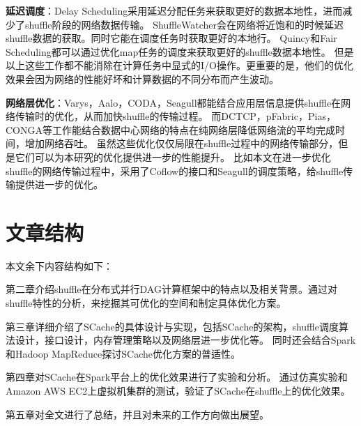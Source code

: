 \textbf{延迟调度}：Delay Scheduling\cite{delay}采用延迟分配任务来获取更好的数据本地性，进而减少了shuffle阶段的网络数据传输。
ShuffleWatcher\cite{shufflewatcher}会在网络将近饱和的时候延迟shuffle数据的获取。同时它能在调度任务时获取更好的本地行。
Quincy\cite{quincy}和Fair Scheduling\cite{preemptive}都可以通过优化map任务的调度来获取更好的shuffle数据本地性。
但是以上这些工作都不能消除在计算任务中显式的I/O操作。更重要的是，他们的优化效果会因为网络的性能好坏和计算数据的不同分布而产生波动。

\textbf{网络层优化}：Varys\cite{varys}，Aalo\cite{aalo}，CODA\cite{coda}，Seagull\cite{seagull}都能结合应用层信息提供shuffle在网络传输时的优化，从而加快shuffle的传输过程。
而DCTCP\cite{dctcp}，pFabric\cite{pfabric}，Pias\cite{pias}，CONGA\cite{conga}等工作能结合数据中心网络的特点在纯网络层降低网络流的平均完成时间，增加网络吞吐。
虽然这些优化仅仅局限在shuffle过程中的网络传输部分，但是它们可以为本研究的优化提供进一步的性能提升。
比如本文在进一步优化shuffle的网络传输过程中，采用了Coflow\cite{coflow}的接口和Seagull的调度策略，给shuffle传输提供进一步的优化。

\section{文章结构}

本文余下内容结构如下：

第二章介绍shuffle在分布式并行DAG计算框架中的特点以及相关背景。通过对shuffle特性的分析，来挖掘其可优化的空间和制定具体优化方案。

第三章详细介绍了SCache的具体设计与实现，包括SCache的架构，shuffle调度算法设计，接口设计，内存管理策略以及网络层进一步优化等。
同时还会结合Spark\cite{apachespark}和Hadoop MapReduce\cite{hadoop}探讨SCache优化方案的普适性。

第四章对SCache在Spark\cite{apachespark}平台上的优化效果进行了实验和分析。
通过仿真实验和Amazon AWS EC2上虚拟机集群的测试，验证了SCache在shuffle上的优化效果。

第五章对全文进行了总结，并且对未来的工作方向做出展望。







